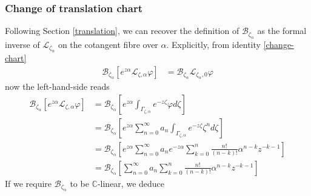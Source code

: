 \documentclass{article}
\theoremstyle{definition}
\newcommand{\C}{\mathbb{C}}
\newcommand{\laplace}{\mathcal{L}}
\newcommand{\borel}{\mathcal{B}}
\theoremstyle{plain}
\begin{document}
\subsubsection{Change of translation chart}\label{transl-borel}

Following Section \ref{translation}, we can recover the definition of $\borel_{\zeta_\alpha}$
as the formal inverse of $\laplace_{\zeta_\alpha}$ on the cotangent fibre over $\alpha$. Explicitly, from identity \eqref{change-chart}
  \begin{align*}
      \borel_{\zeta_\alpha}\left[e^{z\alpha} \laplace_{\zeta,\alpha}\varphi\right]&=\borel_{\zeta_\alpha}\laplace_{\zeta_\alpha,0}\varphi
  \end{align*}
  now the left-hand-side reads
  \begin{align*}
      \borel_{\zeta_\alpha}\left[e^{z\alpha} \laplace_{\zeta,\alpha}\varphi\right]&=\borel_{\zeta_\alpha}\left[e^{z\alpha} \int_{\Gamma_{\zeta,\alpha}}e^{-z\zeta}\varphi d\zeta\right]\\
      &=\borel_{\zeta_\alpha}\left[e^{z\alpha} \sum_{n=0}^{\infty}a_n\int_{\Gamma_{\zeta,\alpha}}e^{-z\zeta}\zeta^n d\zeta\right]\\
      &=\borel_{\zeta_\alpha}\left[e^{z\alpha} \sum_{n=0}^{\infty}a_ne^{-z\alpha}\sum_{k=0}^{n}\frac{n!}{(n-k)!}\alpha^{n-k}z^{-k-1}\right]\\
      &=\borel_{\zeta_\alpha}\left[\sum_{n=0}^{\infty}a_n \sum_{k=0}^{n}\frac{n!}{(n-k)!}\alpha^{n-k}  z^{-k-1}\right]
  \end{align*}
     If we require $\borel_{\zeta_\alpha}$ to be $\C$-linear, we deduce 
\end{document}
